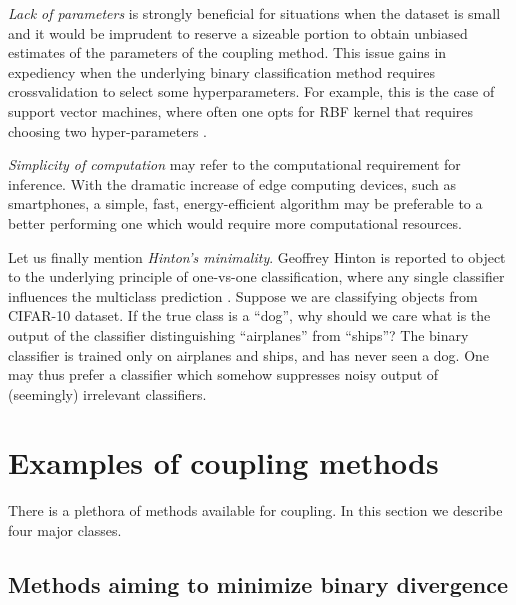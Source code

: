 \documentclass[pdflatex, sn-basic]{sn-jnl}%
\theoremstyle{thmstyleone}%
\theoremstyle{thmstyletwo}%
\theoremstyle{thmstylethree}%
\begin{document}
\emph{Lack of parameters} is strongly beneficial for situations when the dataset is small and it would be imprudent to reserve a sizeable portion to obtain unbiased estimates of the parameters of the coupling method. 
This issue gains in expediency when the underlying binary classification method requires crossvalidation to select some hyperparameters. For example, this is the case of support vector machines, where often one opts for RBF kernel that requires choosing two hyper-parameters \cite{wu2004probability}. 

\emph{Simplicity of computation}  may refer to the computational requirement for inference. With the dramatic increase of edge computing devices, such as smartphones, a simple, fast, energy-efficient algorithm may be preferable to a better performing one which would require more computational resources. 

Let us finally mention \emph{Hinton's minimality}. Geoffrey Hinton is reported to object to the underlying principle of one-vs-one classification, where any single classifier influences the multiclass prediction \cite[p.~467]{hastie1998classification}. Suppose we are classifying objects from CIFAR-10 dataset.  If the true class is  a ``dog'', why should we care what is the output of the classifier distinguishing ``airplanes'' from ``ships''? The binary classifier is trained only on airplanes and ships, and has never seen a dog. One may thus prefer a classifier which somehow suppresses noisy output of (seemingly) irrelevant classifiers.







\section{Examples of coupling methods} \label{sec:coupling}

There is a plethora of methods available for coupling. In this section we describe four major classes.

\subsection{Methods aiming to minimize binary divergence}
\end{document}
